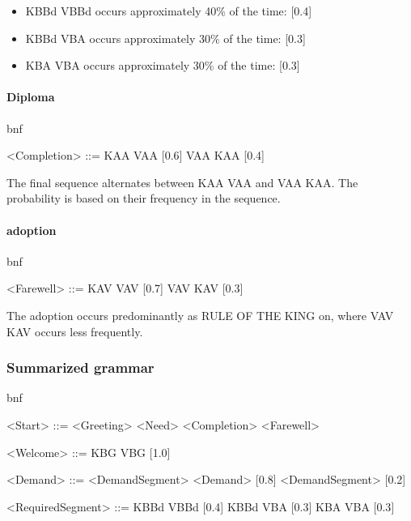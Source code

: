 \documentclass[
]{article}
\begin{document}
\begin{itemize}
\item
  KBBd VBBd occurs approximately 40\% of the time: {[}0.4{]}
\item
  KBBd VBA occurs approximately 30\% of the time: {[}0.3{]}
\item
  KBA VBA occurs approximately 30\% of the time: {[}0.3{]}
\end{itemize}

\paragraph{\texorpdfstring{\textbf{Diploma}}{Diploma}}\label{diploma}

bnf

\textless Completion\textgreater{} ::= KAA VAA {[}0.6{]} \textbar{} VAA
KAA {[}0.4{]}

The final sequence alternates between KAA VAA and VAA KAA. The
probability is based on their frequency in the sequence.

\paragraph{\texorpdfstring{\textbf{adoption}}{adoption}}\label{adoption}

bnf

\textless Farewell\textgreater{} ::= KAV VAV {[}0.7{]} \textbar{} VAV
KAV {[}0.3{]}

The adoption occurs predominantly as RULE OF THE KING on, where VAV KAV
occurs less frequently.

\subsubsection{\texorpdfstring{\textbf{Summarized
grammar}}{Summarized grammar}}\label{summarized-grammar}

bnf

\textless Start\textgreater{} ::= \textless Greeting\textgreater{}
\textless Need\textgreater{} \textless Completion\textgreater{}
\textless Farewell\textgreater{}

\textless Welcome\textgreater{} ::= KBG VBG {[}1.0{]}

\textless Demand\textgreater{} ::= \textless DemandSegment\textgreater{}
\textless Demand\textgreater{} {[}0.8{]} \textbar{}
\textless DemandSegment\textgreater{} {[}0.2{]}

\textless RequiredSegment\textgreater{} ::= KBBd VBBd {[}0.4{]}
\textbar{} KBBd VBA {[}0.3{]} \textbar{} KBA VBA {[}0.3{]}
\end{document}
